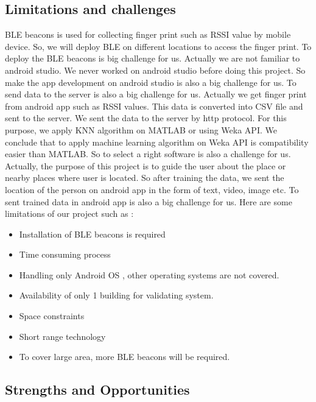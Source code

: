 \documentclass{article}
\begin{document}
\subsection{Limitations and challenges}
BLE beacons is used for collecting finger print such as RSSI value by mobile device. So, we will deploy BLE on different locations to access the finger print. To deploy the BLE beacons is big  challenge for us.
Actually we are not familiar to android studio. We never worked on android studio before doing this project. So make the app development on android studio is also a big challenge for us. 
To send data to the server is also a big challenge for us. Actually we get finger print from android app such as RSSI values. This data is converted into CSV file and sent to the server. We sent the data to the server by http protocol. 
For this purpose, we apply KNN algorithm on MATLAB or using Weka API. We conclude that to apply machine learning algorithm on Weka API is compatibility easier than MATLAB. So to select a right software is also a challenge for us. 
Actually, the purpose of this project is to guide the user about the place or nearby places where user is located. So after training the data, we sent the location of the person on android app in the form of text, video, image etc. To sent trained data in android app is also a big challenge for us. 
Here are some limitations of our project such as : 
\begin{itemize}
\item Installation of BLE beacons is required
\item Time consuming process
\item Handling only Android OS , other operating systems are not covered.
\item Availability of only 1 building for validating system.
\item Space constraints
\item Short range technology
\item To cover large area, more BLE beacons will be required.
\end{itemize}
\subsection{Strengths and Opportunities}
\end{document}

